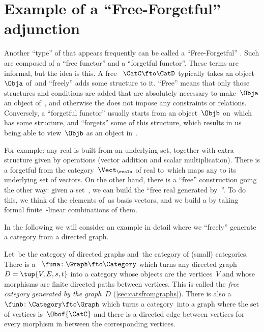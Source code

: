 
\section[Free-forgetful adjunction]{Example of a ``Free-Forgetful'' adjunction}
\label{sec:free-forgetful-adjunction-graph-example}

Another ``type'' of  that appears frequently can be called a ``Free-Forgetful'' .
Such  are composed of a ``free functor'' and a ``forgetful functor''.
These terms are informal, but the idea is this.
A free ~$\CatC \fto \CatD$ typically takes an object~$\Obja$ of~\CatC and ``freely'' adds some structure to it.
``Free'' means that only those structures and conditions are added that are absolutely necessary to make~$\Obja$ an object of~\CatD, and otherwise the  does not impose any constraints or relations.
Conversely, a ``forgetful functor'' usually starts from an object~$\Objb$ on~\CatD which has some structure, and ``forgets'' some of this structure, which results in us being able to view~$\Objb$ as an object in~\CatC.

For example: any real  is built from an underlying set, together with extra structure given by operations (vector addition and scalar multiplication).
There is a forgetful  from the category~$\Vect_{\reals}$ of real  to~\Set which maps any  to its underlying set of vectors.
On the other hand, there is a ``free'' construction going the other way: given a set~\setA, we can build the ``free real  generated by~\setA''.
To do this, we think of the elements of~\setA as basis vectors, and we build a  by taking formal finite~\reals-linear combinations of them.

In the following we will consider an example in detail where we ``freely'' generate a category from a directed graph.

Let~\Graph be the category of directed graphs and~\Category the category of (small) categories.
There is a ~$\funa \colon \Graph \fto \Category$ which turns any directed graph~$D = \tup{V,E, s,t}$ into a category whose objects are the vertices~$V$ and whose morphisms are finite directed paths between vertices.
This is called the \emph{free category generated by the graph~$D$} (\cref{sec:catsfromgraphs}).
There is also a ~$\funb \colon \Category \fto \Graph$ which turns a category~\CatC into a graph where the set of vertices is~$\Obof{\CatC}$ and there is a directed edge between vertices for every morphism in \CatC between the corresponding vertices.

